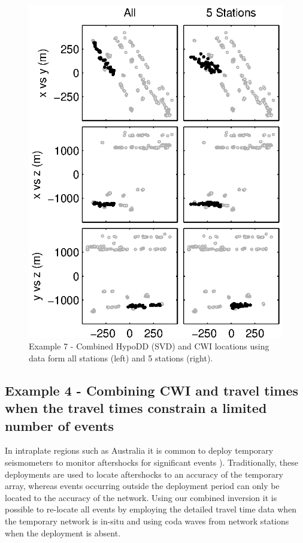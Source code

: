 \documentclass[extra]{gji}
\begin{document}
\begin{figure}
\includegraphics{diags/CalaverasLoc5_hypoDD_SVD.eps}
\caption{Example 7 - Combined HypoDD (SVD) and CWI locations using
data form all stations (left) and 5 stations (right).}
\label{fig-68Calaverasevents_ttandcoda1}
\end{figure}




\subsection{Example 4 - Combining CWI and travel times when the travel times constrain a limited number of events}


In intraplate regions such as Australia it is common to deploy
temporary seismometers to monitor aftershocks for significant events
\citep{dr_Bowman90a, dr_Leonard02a}). Traditionally, these
deployments are used to locate aftershocks to an accuracy of the
temporary array, whereas events occurring outside the deployment
period can only be located to the accuracy of the network. Using our
combined inversion it is possible to re-locate all events by
employing the detailed travel time data when the temporary network
is in-situ and using coda waves from network stations when the
deployment is absent.
\end{document}
